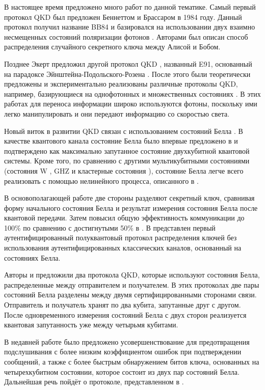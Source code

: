 \documentclass[a4paper,11pt]{article}
\begin{document}
В настоящее время предложено много работ по данной тематике. Самый первый протокол QKD был предложен Беннеттом и Брассаром в 1984 году. Данный протокол получил название BB84 и базировался на использовании двух взаимно несмещенных состояний поляризации фотонов \cite{BB84}. Авторами был описан способ распределения случайного секретного ключа между Алисой и Бобом. 
 
Позднее Экерт предложил другой протокол QKD \cite{E91}, названный E91, основанный на парадоксе Эйнштейна-Подольского-Розена \cite{EPR}. После этого были теоретически предложены и экспериментально реализованы различные протоколы QKD, например, базирующиеся на однофотонных \cite{liang2015simple} и множественных состояниях \cite{fourstate}. В этих работах для переноса информации широко используются фотоны, поскольку ими легко манипулировать и они передают информацию со скоростью света.

Новый виток в развитии QKD связан с использованием состояний Белла \cite{EPR}.
В качестве квантового канала состояние Белла было впервые предложено в \cite{Gao} и подтверждено \cite{bellstatescomp} как максимально запутанное состояние двухкубитной квантовой системы. Кроме того, по сравнению с другими мультикубитными состояниями (состояния W \cite{W}, GHZ \cite{GHZ} и кластерные состояния \cite{cluster}), состояние Белла легче всего реализовать с помощью нелинейного процесса, описанного в  \cite{twophotons}. 

В основополагающей работе \cite{Gao} две стороны разделяют секретный ключ, сравнивая форму начального состояния Белла и результат измерения состояния Белла после квантовой передачи.
Затем \cite{nine} повысил общую эффективность коммуникации до 100\% по сравнению с достигнутыми 50\% в \cite{Gao}. В \cite{ten} представлен первый аутентифицированный полуквантовый протокол распределения ключей без использования аутентифицированных классических каналов, основанный на состояниях Белла.

Авторы \cite{Gao} и \cite{nine} предложили два протокола QKD, которые используют состояния Белла, распределенные между отправителем и получателем. В этих протоколах две пары состояний Белла разделены между двумя сертифицированными сторонами связи. Отправитель и получатель хранят по два кубита, запутанные друг с другом. После одновременного измерения состояний Белла с двух сторон реализуется квантовая запутанность уже между четырьмя кубитами.

В недавней работе \cite{base} было предложено усовершенствование \cite{nine} для предотвращения подслушивания с более низким коэффициентом ошибок при подтверждении сообщений, а также с более быстрым обнаружением битов ключа, основанных на четырехкубитном состоянии, которое состоит из двух пар состояний Белла. Дальнейшая речь пойдёт о протоколе, представленном в \cite{base}.
\end{document}
